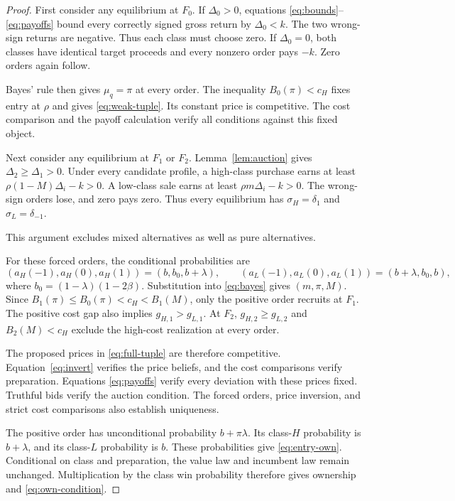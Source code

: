 \documentclass[12pt]{article}
\begin{document}
\begin{proof}
First consider any equilibrium at $F_0$.
If $\Delta_0>0$, equations \eqref{eq:bounds}--\eqref{eq:payoffs} bound every correctly signed gross return by $\Delta_0<k$.
The two wrong-sign returns are negative.
Thus each class must choose zero.
If $\Delta_0=0$, both classes have identical target proceeds and every nonzero order pays $-k$.
Zero orders again follow.

Bayes' rule then gives $\mu_q=\pi$ at every order.
The inequality $B_0(\pi)<c_H$ fixes entry at $\rho$ and gives \eqref{eq:weak-tuple}.
Its constant price is competitive.
The cost comparison and the payoff calculation verify all conditions against this fixed object.

Next consider any equilibrium at $F_1$ or $F_2$.
Lemma~\ref{lem:auction} gives $\Delta_2\ge\Delta_1>0$.
Under every candidate profile, a high-class purchase earns at least $\rho(1-M)\Delta_i-k>0$.
A low-class sale earns at least $\rho m\Delta_i-k>0$.
The wrong-sign orders lose, and zero pays zero.
Thus every equilibrium has $\sigma_H=\delta_1$ and $\sigma_L=\delta_{-1}$.

This argument excludes mixed alternatives as well as pure alternatives.

For these forced orders, the conditional probabilities are
\[
 (a_H(-1),a_H(0),a_H(1))=(b,b_0,b+\lambda),\qquad
 (a_L(-1),a_L(0),a_L(1))=(b+\lambda,b_0,b),
\]
where $b_0=(1-\lambda)(1-2\beta)$.
Substitution into \eqref{eq:bayes} gives $(m,\pi,M)$.
Since $B_1(\pi)\le B_0(\pi)<c_H<B_1(M)$, only the positive order recruits at $F_1$.
The positive cost gap also implies $g_{H,1}>g_{L,1}$.
At $F_2$, $g_{H,2}\ge g_{L,2}$ and $B_2(M)<c_H$ exclude the high-cost realization at every order.

The proposed prices in \eqref{eq:full-tuple} are therefore competitive.
Equation~\eqref{eq:invert} verifies the price beliefs, and the cost comparisons verify preparation.
Equations \eqref{eq:payoffs} verify every deviation with these prices fixed.
Truthful bids verify the auction condition.
The forced orders, price inversion, and strict cost comparisons also establish uniqueness.

The positive order has unconditional probability $b+\pi\lambda$.
Its class-$H$ probability is $b+\lambda$, and its class-$L$ probability is $b$.
These probabilities give \eqref{eq:entry-own}.
Conditional on class and preparation, the value law and incumbent law remain unchanged.
Multiplication by the class win probability therefore gives ownership and \eqref{eq:own-condition}.
\end{proof}
\end{document}
